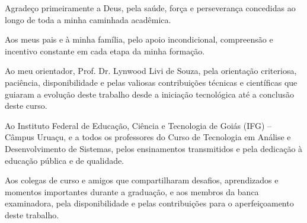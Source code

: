 \begin{agradecimentos}
Agradeço primeiramente a Deus, pela saúde, força e perseverança concedidas ao longo de toda a minha caminhada acadêmica.

Aos meus pais e à minha família, pelo apoio incondicional, compreensão e incentivo constante em cada etapa da minha formação.

Ao meu orientador, Prof. Dr. Lynwood Livi de Souza, pela orientação criteriosa, paciência, disponibilidade e pelas valiosas contribuições técnicas e científicas que guiaram a evolução deste trabalho desde a iniciação tecnológica até a conclusão deste curso.

Ao Instituto Federal de Educação, Ciência e Tecnologia de Goiás (IFG) – Câmpus Uruaçu, e a todos os professores do Curso de Tecnologia em Análise e Desenvolvimento de Sistemas, pelos ensinamentos transmitidos e pela dedicação à educação pública e de qualidade.

Aos colegas de curso e amigos que compartilharam desafios, aprendizados e momentos importantes durante a graduação, e aos membros da banca examinadora, pela disponibilidade e pelas contribuições para o aperfeiçoamento deste trabalho.
\end{agradecimentos}

